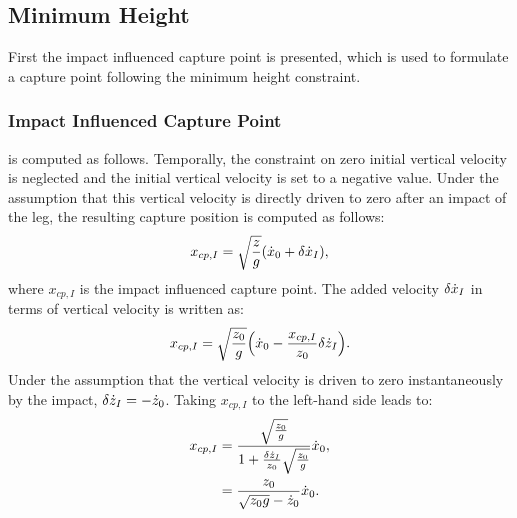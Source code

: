 \subsection{Minimum Height}
First the impact influenced capture point is presented, which is used to formulate a capture point following the minimum height constraint.
\subsubsection{Impact Influenced Capture Point} is computed as follows. Temporally, the constraint on zero initial vertical velocity is neglected and the initial vertical velocity is set to a negative value. Under the assumption that this vertical velocity is directly driven to zero after an impact of the leg, the resulting capture position is computed as follows:
\begin{equation}
x_{cp,I} = \sqrt{\frac{z}{g}}(\dot{x}_0+\delta \dot{x}_I),
\end{equation}
where $x_{cp,I}$ is the impact influenced capture point. The added velocity $\delta \dot{x}_I$ in terms of vertical velocity is written as:
\begin{equation}
x_{cp,I} = \sqrt{\frac{z_0}{g}}\Big(\dot{x}_0-\frac{x_{cp,I}}{z_0}\delta \dot{z}_I\Big).
\end{equation}
Under the assumption that the vertical velocity is driven to zero instantaneously by the impact, $\delta \dot{z}_I=-\dot{z}_0$. Taking $x_{cp,I}$ to the left-hand side leads to:
\begin{align}\label{eq:xcpimpact}
x_{cp,I} &= \frac{\sqrt{\frac{z_0}{g}}}{1+\frac{\delta \dot{z}_I}{z_0}\sqrt{\frac{z_0}{g}}}\dot{x}_0,\\
			&= \frac{z_0}{\sqrt{z_0g}-\dot{z}_0}\dot{x}_0.
\end{align}

